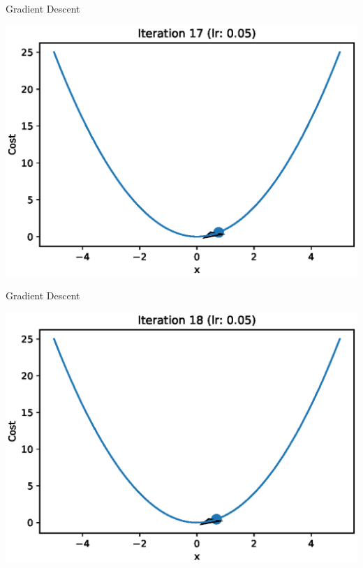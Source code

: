 \documentclass{beamer}
\begin{document}
	\begin{frame}{Gradient Descent}
		\begin{center}
			\includegraphics[totalheight=6cm]{gradient-descent/iteration-17.eps}
		\end{center}
	\end{frame}
	
	\begin{frame}{Gradient Descent}
		\begin{center}
			\includegraphics[totalheight=6cm]{gradient-descent/iteration-18.eps}
		\end{center}
	\end{frame}
	
\end{document}
